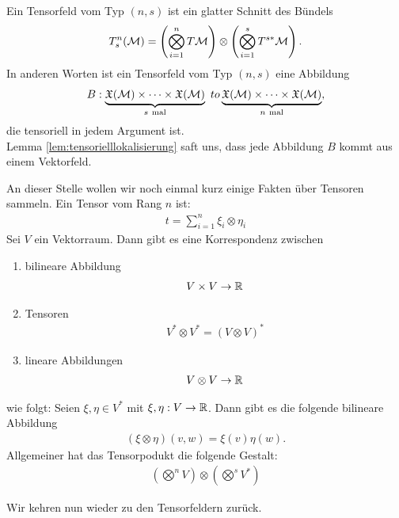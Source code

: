 \begin{defs}[Tensorfeld]
Ein Tensorfeld vom Typ $(n, s)$ ist ein glatter Schnitt des Bündels
\begin{align}
T^{n}_{s} (\mathcal{M}) = \left( \bigotimes^n_{i=1} T \mathcal{M} \right) \otimes \left(\bigotimes^s_{i=1} T^{s*} \mathcal{M}\right).
\end{align}
In anderen Worten ist ein Tensorfeld vom Typ $(n,s)$ eine Abbildung
\begin{align}
B : \underbrace{\mathfrak{X}(\mathcal{M}) \times \cdots \times \mathfrak{X}(\mathcal{M})}_{s \ \mathrm{mal}} \ to \underbrace{\mathfrak{X}(\mathcal{M}) \times \cdots \times \mathfrak{X}(\mathcal{M})}_{n \ \mathrm{mal}},
\end{align}
die tensoriell in jedem Argument ist.\\
Lemma \ref{lem:tensorielllokalisierung} saft uns, dass jede Abbildung $B$ kommt aus einem Vektorfeld.
\end{defs}

An dieser Stelle wollen wir noch einmal kurz einige Fakten über Tensoren sammeln.
Ein Tensor vom Rang $n$ ist:
\begin{align}
t = \sum^n_{i=1} \xi_i \otimes \eta_i
\end{align}
Sei $V$ ein Vektorraum. 
Dann gibt es eine Korrespondenz zwischen
\begin{enumerate}
\item bilineare Abbildung 
\begin{align}
V \times V \to \mathbb{R}
\end{align}
\item Tensoren 
\begin{align}
V^* \otimes V^* = (V \otimes V)^*
\end{align}
\item lineare Abbildungen
\begin{align}
V \otimes V \to \mathbb{R}
\end{align}
\end{enumerate}
wie folgt:
Seien $\xi, \eta \in V^*$ mit $\xi, \eta: V \to \mathbb{R}$.
Dann gibt es die folgende bilineare Abbildung 
\begin{align}
(\xi \otimes \eta)(v, w) = \xi (v) \eta (w).
\end{align}
Allgemeiner hat das Tensorpodukt die folgende Gestalt:
\begin{align}
\left( \bigotimes^n V \right) \otimes \left( \bigotimes^s V^* \right)
\end{align}


Wir kehren nun wieder zu den Tensorfeldern zurück.


